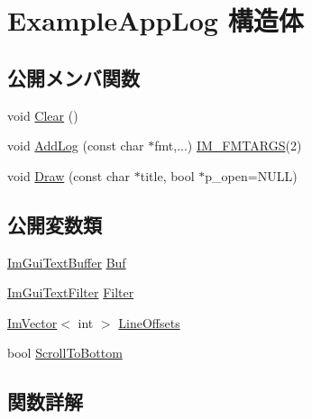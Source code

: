 \hypertarget{struct_example_app_log}{}\section{Example\+App\+Log 構造体}
\label{struct_example_app_log}
\subsection*{公開メンバ関数}
\begin{DoxyCompactItemize}
\item 
void \mbox{\hyperlink{struct_example_app_log_ab9c298defddbb106fdfe4ab16c5eebac}{Clear}} ()
\item 
void \mbox{\hyperlink{struct_example_app_log_afd296fb3b2559acd341fd92883f8f571}{Add\+Log}} (const char $\ast$fmt,...) \mbox{\hyperlink{imgui_8h_a1251c2f9ddac0873dbad8181bd82c9f1}{I\+M\+\_\+\+F\+M\+T\+A\+R\+GS}}(2)
\item 
void \mbox{\hyperlink{struct_example_app_log_a5ad3a4bdb89171b84aeaff96948a1f77}{Draw}} (const char $\ast$title, bool $\ast$p\+\_\+open=N\+U\+LL)
\end{DoxyCompactItemize}
\subsection*{公開変数類}
\begin{DoxyCompactItemize}
\item 
\mbox{\hyperlink{struct_im_gui_text_buffer}{Im\+Gui\+Text\+Buffer}} \mbox{\hyperlink{struct_example_app_log_a74fb7cd7bd8c2507b41331ebb7d0e56d}{Buf}}
\item 
\mbox{\hyperlink{struct_im_gui_text_filter}{Im\+Gui\+Text\+Filter}} \mbox{\hyperlink{struct_example_app_log_a4571947a6000e984ec8da9b7166e1e2b}{Filter}}
\item 
\mbox{\hyperlink{class_im_vector}{Im\+Vector}}$<$ int $>$ \mbox{\hyperlink{struct_example_app_log_af197fca7116f9033a5a5e831ee764ee2}{Line\+Offsets}}
\item 
bool \mbox{\hyperlink{struct_example_app_log_a6834b71563c0595e67b78afb6c7ce39d}{Scroll\+To\+Bottom}}
\end{DoxyCompactItemize}


\subsection{関数詳解}
\mbox{\label{struct_example_app_log_afd296fb3b2559acd341fd92883f8f571}} 
